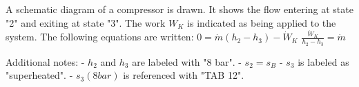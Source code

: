 A schematic diagram of a compressor is drawn. It shows the flow entering at state "2" and exiting at state "3". The work \( W_K \) is indicated as being applied to the system.  
The following equations are written:  
\( 0 = \dot{m} (h_2 - h_3) - \dot{W}_K \)  
\( \frac{\dot{W}_K}{h_2 - h_3} = \dot{m} \)  

Additional notes:  
- \( h_2 \) and \( h_3 \) are labeled with "8 bar".  
- \( s_2 = s_B \)  
- \( s_3 \) is labeled as "superheated".  
- \( s_3 (8 bar) \) is referenced with "TAB 12".